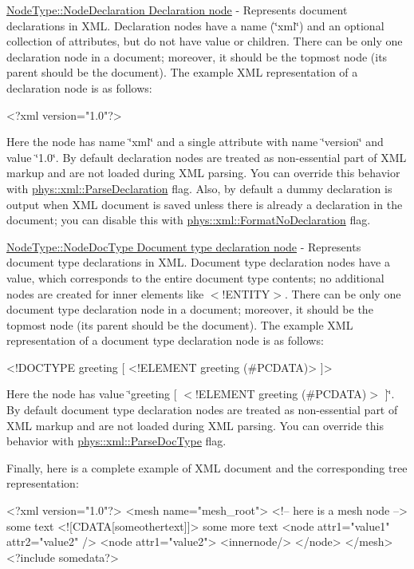\begin{DoxyItemize}
\item \hyperlink{namespacephys_1_1xml_a668b0cc666a9d49f7c7222a7552115d3}{NodeType::NodeDeclaration Declaration node} -\/ Represents document declarations in XML. Declaration nodes have a name (\char`\"{}xml\char`\"{}) and an optional collection of attributes, but do not have value or children. There can be only one declaration node in a document; moreover, it should be the topmost node (its parent should be the document). The example XML representation of a declaration node is as follows: 
\begin{DoxyCode}
 <?xml version="1.0"?> 
\end{DoxyCode}
 Here the node has name \char`\"{}xml\char`\"{} and a single attribute with name \char`\"{}version\char`\"{} and value \char`\"{}1.0\char`\"{}. By default declaration nodes are treated as non-\/essential part of XML markup and are not loaded during XML parsing. You can override this behavior with \hyperlink{namespacephys_1_1xml_a463f15fc43d69ab835c8598826f65646}{phys::xml::ParseDeclaration} flag. Also, by default a dummy declaration is output when XML document is saved unless there is already a declaration in the document; you can disable this with \hyperlink{namespacephys_1_1xml_aee4ccb3535945d4808a0cf6abe4cb050}{phys::xml::FormatNoDeclaration} flag. \par

\item \hyperlink{namespacephys_1_1xml_a668b0cc666a9d49f7c7222a7552115d3}{NodeType::NodeDocType Document type declaration node} -\/ Represents document type declarations in XML. Document type declaration nodes have a value, which corresponds to the entire document type contents; no additional nodes are created for inner elements like $<$!ENTITY$>$. There can be only one document type declaration node in a document; moreover, it should be the topmost node (its parent should be the document). The example XML representation of a document type declaration node is as follows: 
\begin{DoxyCode}
 <!DOCTYPE greeting [ <!ELEMENT greeting (#PCDATA)> ]> 
\end{DoxyCode}
 Here the node has value \char`\"{}greeting \mbox{[} $<$!ELEMENT greeting (\#PCDATA)$>$ \mbox{]}\char`\"{}. By default document type declaration nodes are treated as non-\/essential part of XML markup and are not loaded during XML parsing. You can override this behavior with \hyperlink{namespacephys_1_1xml_adf5ee79dc4c200ad85b64a8308b0c805}{phys::xml::ParseDocType} flag. \par
 \par
 Finally, here is a complete example of XML document and the corresponding tree representation: 
\begin{DoxyCode}
 <?xml version="1.0"?>
 <mesh name="mesh_root">
     <!-- here is a mesh node -->
     some text
     <![CDATA[someothertext]]>
     some more text
     <node attr1="value1" attr2="value2" />
     <node attr1="value2">
         <innernode/>
     </node>
 </mesh>
 <?include somedata?>
\end{DoxyCode}
  

\end{DoxyItemize}

